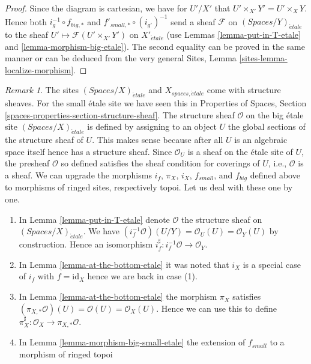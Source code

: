 \documentclass{stacks-project}
\theoremstyle{plain}
\theoremstyle{definition}
\theoremstyle{remark}
\newtheorem{remark}[subsection]{Remark}
\numberwithin{equation}{subsection}
\def\etale{{\acute{e}tale}}
\begin{document}
\begin{proof}
Since the diagram is cartesian, we have for $U'/X'$
that $U' \times_{X'} Y' = U' \times_X Y$. Hence both
$i_g^{-1} \circ f_{big, *}$ and $f'_{small, *} \circ (i_{g'})^{-1}$
send a sheaf $\mathcal{F}$ on $(\textit{Spaces}/Y)_\etale$ to the sheaf
$U' \mapsto \mathcal{F}(U' \times_{X'} Y')$ on $X'_\etale$
(use Lemmas \ref{lemma-put-in-T-etale} and \ref{lemma-morphism-big-etale}).
The second equality can be proved in the same manner or can be
deduced from the very general
Sites, Lemma \ref{sites-lemma-localize-morphism}.
\end{proof}

\begin{remark}
\label{remark-change-topologies-ringed}
The sites $(\textit{Spaces}/X)_\etale$ and $X_{spaces, \etale}$
come with structure sheaves. For the small \'etale site we
have seen this in Properties of Spaces, Section
\ref{spaces-properties-section-structure-sheaf}.
The structure sheaf $\mathcal{O}$ on the big \'etale site
$(\textit{Spaces}/X)_\etale$ is defined by assigning to an object
$U$ the global sections of the structure sheaf of $U$.
This makes sense because after all $U$ is an algebraic space
itself hence has a structure sheaf. Since $\mathcal{O}_U$
is a sheaf on the \'etale site of $U$, the presheaf $\mathcal{O}$
so defined satisfies the sheaf condition for coverings of $U$, i.e.,
$\mathcal{O}$ is a sheaf.
We can upgrade the morphisms $i_f$, $\pi_X$, $i_X$, $f_{small}$, and
$f_{big}$ defined above to morphisms of ringed sites, respectively topoi.
Let us deal with these one by one.
\begin{enumerate}
\item In Lemma \ref{lemma-put-in-T-etale} denote $\mathcal{O}$
the structure sheaf on $(\textit{Spaces}/X)_\etale$.
We have $(i_f^{-1}\mathcal{O})(U/Y) = \mathcal{O}_U(U) = \mathcal{O}_Y(U)$
by construction.
Hence an isomorphism $i_f^\sharp : i_f^{-1}\mathcal{O} \to \mathcal{O}_Y$.
\item In Lemma \ref{lemma-at-the-bottom-etale} it was noted
that $i_X$ is a special case of $i_f$ with $f = \text{id}_X$
hence we are back in case (1).
\item In Lemma \ref{lemma-at-the-bottom-etale} the morphism
$\pi_X$ satisfies $(\pi_{X, *}\mathcal{O})(U) = \mathcal{O}(U) =
\mathcal{O}_X(U)$. Hence we can use this to define
$\pi_X^\sharp : \mathcal{O}_X \to \pi_{X, *}\mathcal{O}$.
\item In Lemma \ref{lemma-morphism-big-small-etale}
the extension of $f_{small}$ to a morphism of ringed topoi

\end{enumerate}
\end{remark}
\end{document}
